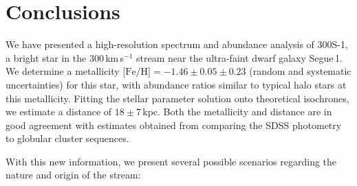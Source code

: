 \documentclass{emulateapj}
\begin{document}
\section{Conclusions} \label{sec:conc}

We have presented a high-resolution spectrum and abundance analysis of
300S-1, a bright star in the 300\,km\,s$^{-1}$ stream near the
ultra-faint dwarf galaxy Segue\,1. We determine a metallicity
$\mbox{[Fe/H]} = -1.46 \pm 0.05 \pm 0.23$ (random and systematic
uncertainties) for this star, with abundance ratios similar to typical
halo stars at this metallicity. Fitting the stellar parameter solution
onto theoretical isochrones, we estimate a distance of $18 \pm
7$\,kpc. Both the metallicity and distance are in good agreement with
estimates obtained from comparing the SDSS photometry to globular
cluster sequences.

With this new information, we present several possible scenarios
regarding the nature and origin of the stream:
\end{document}
